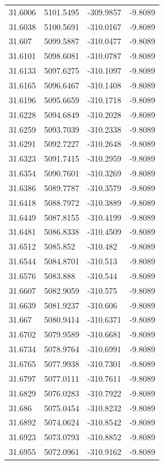 \begin{table}[H]
\begin{tabular}{llll}
31.6006 & 5101.5495 & -309.9857 & -9.8089 \\
31.6038 & 5100.5691 & -310.0167 & -9.8089 \\
31.607 & 5099.5887 & -310.0477 & -9.8089 \\
31.6101 & 5098.6081 & -310.0787 & -9.8089 \\
31.6133 & 5097.6275 & -310.1097 & -9.8089 \\
31.6165 & 5096.6467 & -310.1408 & -9.8089 \\
31.6196 & 5095.6659 & -310.1718 & -9.8089 \\
31.6228 & 5094.6849 & -310.2028 & -9.8089 \\
31.6259 & 5093.7039 & -310.2338 & -9.8089 \\
31.6291 & 5092.7227 & -310.2648 & -9.8089 \\
31.6323 & 5091.7415 & -310.2959 & -9.8089 \\
31.6354 & 5090.7601 & -310.3269 & -9.8089 \\
31.6386 & 5089.7787 & -310.3579 & -9.8089 \\
31.6418 & 5088.7972 & -310.3889 & -9.8089 \\
31.6449 & 5087.8155 & -310.4199 & -9.8089 \\
31.6481 & 5086.8338 & -310.4509 & -9.8089 \\
31.6512 & 5085.852 & -310.482 & -9.8089 \\
31.6544 & 5084.8701 & -310.513 & -9.8089 \\
31.6576 & 5083.888 & -310.544 & -9.8089 \\
31.6607 & 5082.9059 & -310.575 & -9.8089 \\
31.6639 & 5081.9237 & -310.606 & -9.8089 \\
31.667 & 5080.9414 & -310.6371 & -9.8089 \\
31.6702 & 5079.9589 & -310.6681 & -9.8089 \\
31.6734 & 5078.9764 & -310.6991 & -9.8089 \\
31.6765 & 5077.9938 & -310.7301 & -9.8089 \\
31.6797 & 5077.0111 & -310.7611 & -9.8089 \\
31.6829 & 5076.0283 & -310.7922 & -9.8089 \\
31.686 & 5075.0454 & -310.8232 & -9.8089 \\
31.6892 & 5074.0624 & -310.8542 & -9.8089 \\
31.6923 & 5073.0793 & -310.8852 & -9.8089 \\
31.6955 & 5072.0961 & -310.9162 & -9.8089 \\

\end{tabular}
\end{table}
